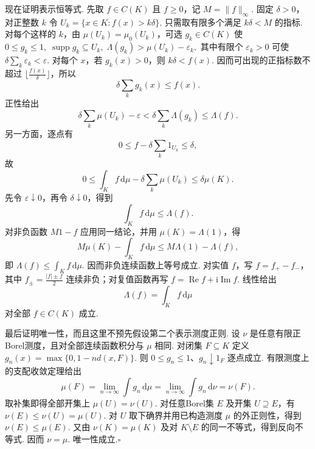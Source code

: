 \begin{FAProof}
现在证明表示恒等式. 先取 \(\displaystyle f\in C(K)\) 且 \(\displaystyle f\geqslant0\)，记 \(\displaystyle M=\|f\|_\infty\). 固定 \(\displaystyle\delta>0\)，对正整数 \(\displaystyle k\) 令
\(\displaystyle U_k=\{x\in K:f(x)>k\delta\}.\)
只需取有限多个满足 \(\displaystyle k\delta<M\) 的指标. 对每个这样的 \(\displaystyle k\)，由 \(\displaystyle\mu(U_k)=\mu_0(U_k)\)，可选 \(\displaystyle g_k\in C(K)\) 使
\(\displaystyle 0\leqslant g_k\leqslant1, \; \operatorname{supp}g_k\subseteq U_k, \; \Lambda(g_k)>\mu(U_k)-\varepsilon_k,\)
其中有限个 \(\displaystyle\varepsilon_k>0\) 可使 \(\displaystyle\delta\sum_k\varepsilon_k<\varepsilon\). 对每个 \(\displaystyle x\)，若 \(\displaystyle g_k(x)>0\)，则 \(\displaystyle k\delta<f(x)\). 因而可出现的正指标数不超过 \(\displaystyle\lfloor \frac{f(x)}{\delta}\rfloor\)，所以
\[
\delta\sum_k g_k(x)\leqslant f(x).
\]
正性给出
\[
\delta\sum_k\mu(U_k)-\varepsilon
<\delta\sum_k\Lambda(g_k)
\leqslant\Lambda(f).
\]
另一方面，逐点有
\[
0\leqslant f-\delta\sum_k1_{U_k}\leqslant\delta,
\]
故
\[
0\leqslant
\int_K f\,\mathrm{d}\mu
-
\delta\sum_k\mu(U_k)
\leqslant\delta\mu(K).
\]
先令 \(\displaystyle\varepsilon\downarrow0\)，再令 \(\displaystyle\delta\downarrow0\)，得到
\[
\int_K f\,\mathrm{d}\mu\leqslant\Lambda(f).
\]
对非负函数 \(\displaystyle M1-f\) 应用同一结论，并用 \(\displaystyle\mu(K)=\Lambda(1)\)，得
\[
M\mu(K)-\int_K f\,\mathrm{d}\mu
\leqslant
M\Lambda(1)-\Lambda(f),
\]
即 \(\displaystyle\Lambda(f)\leqslant\int_K f\,\mathrm{d}\mu\). 因而非负连续函数上等号成立. 对实值 \(\displaystyle f\)，写 \(\displaystyle f=f_+-f_-\)，其中 \(\displaystyle f_\pm=\frac{|f|\pm f}{2}\) 连续非负；对复值函数再写 \(\displaystyle f=\operatorname{Re}f+\mathrm{i}\operatorname{Im}f\). 线性给出
\[
\Lambda(f)=\int_K f\,\mathrm{d}\mu
\]
对全部 \(\displaystyle f\in C(K)\) 成立.

最后证明唯一性，而且这里不预先假设第二个表示测度正则. 设 \(\displaystyle\nu\) 是任意有限正Borel测度，且对全部连续函数积分与 \(\displaystyle\mu\) 相同. 对闭集 \(\displaystyle F\subseteq K\) 定义
\(\displaystyle g_n(x)=\max\{0,1-n d(x,F)\}.\)
则 \(\displaystyle0\leqslant g_n\leqslant1\)、\(\displaystyle g_n\downarrow1_F\) 逐点成立. 有限测度上的支配收敛定理给出
\[
\mu(F)=\lim_{n\to\infty}\int g_n\,\mathrm{d}\mu
=\lim_{n\to\infty}\int g_n\,\mathrm{d}\nu
=\nu(F).
\]
取补集即得全部开集上 \(\displaystyle\mu(U)=\nu(U)\). 对任意Borel集 \(\displaystyle E\) 及开集 \(\displaystyle U\supseteq E\)，有 \(\displaystyle\nu(E)\leqslant\nu(U)=\mu(U)\). 对 \(\displaystyle U\) 取下确界并用已构造测度 \(\displaystyle\mu\) 的外正则性，得到 \(\displaystyle\nu(E)\leqslant\mu(E)\). 又由 \(\displaystyle\nu(K)=\mu(K)\) 及对 \(\displaystyle K\setminus E\) 的同一不等式，得到反向不等式. 因而 \(\displaystyle\nu=\mu\). 唯一性成立.\hfill\(\square\)
\end{FAProof}

